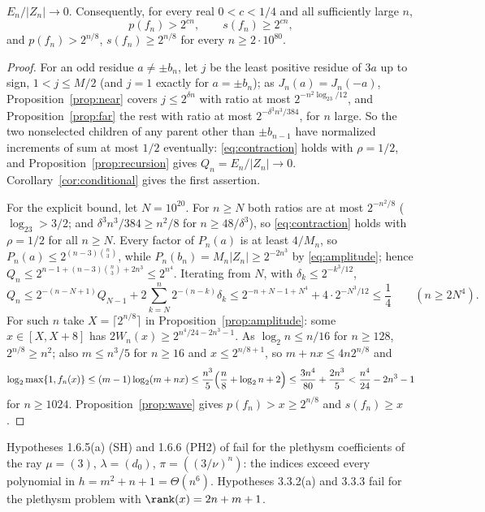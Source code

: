\begin{theorem}\label{thm:indices}
$E_n/|Z_n|\to0$. Consequently, for every real $0<c<1/4$ and all sufficiently
large $n$,
\[
 p(f_n)>2^{cn},\qquad s(f_n)\ge2^{cn},
\]
and $p(f_n)>2^{n/8}$, $s(f_n)\ge2^{n/8}$ for every $n\ge2\cdot10^{80}$.
\end{theorem}

\begin{proof}
For an odd residue $a\ne\pm b_n$, let $j$ be the least positive residue of $3a$
up to sign, $1<j\le M/2$ (and $j=1$ exactly for $a=\pm b_n$); as
$J_n(a)=J_n(-a)$, Proposition~\ref{prop:near} covers $j\le2^{\delta n}$ with
ratio at most $2^{-n^2\log_23/12}$, and Proposition~\ref{prop:far} the rest with
ratio at most $2^{-\delta^3n^3/384}$, for $n$ large. So the two nonselected
children of any parent other than $\pm b_{n-1}$ have normalized increments of
sum at most $1/2$ eventually: \eqref{eq:contraction} holds with $\rho=1/2$, and
Proposition~\ref{prop:recursion} gives $Q_n=E_n/|Z_n|\to0$.
Corollary~\ref{cor:conditional} gives the first assertion.

For the explicit bound, let $N=10^{20}$. For $n\ge N$ both ratios are at most
$2^{-n^2/8}$ ($\log_23>3/2$; and $\delta^3n^3/384\ge n^2/8$ for
$n\ge48/\delta^3$), so \eqref{eq:contraction} holds with $\rho=1/2$ for all
$n\ge N$. Every factor of $P_n(a)$ is at least $4/M_n$, so
$P_n(a)\le2^{(n-3)\binom n3}$, while $P_n(b_n)=M_n|Z_n|\ge2^{-2n^3}$ by
\eqref{eq:amplitude}; hence $Q_n\le2^{n-1+(n-3)\binom n3+2n^3}\le2^{n^4}$.
Iterating from $N$, with $\delta_k\le2^{-k^3/12}$,
\[
 Q_n\le2^{-(n-N+1)}Q_{N-1}+2\sum_{k=N}^n2^{-(n-k)}\delta_k
 \le2^{-n+N-1+N^4}+4\cdot2^{-N^3/12}\le\frac14\qquad(n\ge2N^4).
\]
For such $n$ take $X=\lceil2^{n/8}\rceil$ in Proposition~\ref{prop:amplitude}:
some $x\in[X,X+8]$ has $2W_n(x)\ge2^{n^4/24-2n^3-1}$. As $\log_2n\le n/16$ for
$n\ge128$, $2^{n/8}\ge n^2$; also $m\le n^3/5$ for $n\ge16$ and $x\le2^{n/8+1}$,
so $m+nx\le4n2^{n/8}$ and
\[
 \log_2\max\{1,f_n(x)\}\le(m-1)\log_2(m+nx)\le\frac{n^3}5\Bigl(\frac n8+
 \log_2n+2\Bigr)\le\frac{3n^4}{80}+\frac{2n^3}5<\frac{n^4}{24}-2n^3-1
\]
for $n\ge1024$. Proposition~\ref{prop:wave} gives $p(f_n)>x\ge2^{n/8}$ and
$s(f_n)\ge x$.
\end{proof}

\begin{corollary}\label{cor:PH2SH}
Hypotheses 1.6.5(a) (SH) and 1.6.6 (PH2) of \cite{GCT6} fail for the plethysm
coefficients of the ray $\mu=(3)$, $\lambda=(d_0)$, $\pi=((3/\nu)^n)$: the
indices exceed every polynomial in $h=m^2+n+1=\Theta(n^6)$. Hypotheses
3.3.2(a) and 3.3.3 fail for the plethysm problem with $\rank(x)=2n+m+1$.
\end{corollary}

